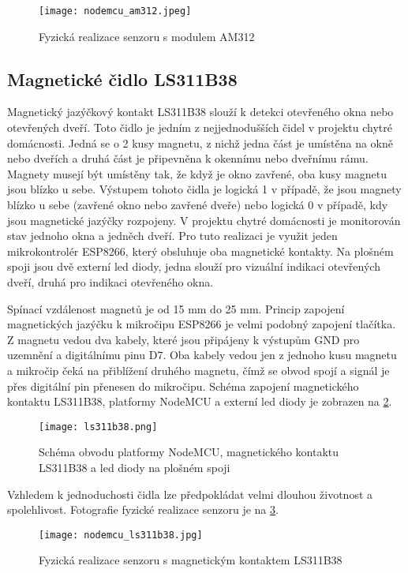 \begin{figure}[H]
  \centering
  \texttt{[image: nodemcu\_am312.jpeg]}
  \caption{Fyzická realizace senzoru s modulem AM312}
  \label{fig:nodemcu_am312}
\end{figure} 

\subsection{Magnetické čidlo LS311B38}
Magnetický jazýčkový kontakt LS311B38 slouží k detekci otevřeného okna nebo otevřených dveří. Toto čidlo je jedním z nejjednodušších čidel v \mbox{projektu} chytré domácnosti. Jedná se o 2 kusy magnetu, z nichž jedna část je umístěna na okně nebo dveřích a druhá část je připevněna k okennímu nebo \mbox{dveřnímu} rámu. Magnety musejí být umístěny tak, že když je okno zavřené, oba kusy magnetu jsou blízko u sebe. Výstupem tohoto čidla je logická 1 v případě, že jsou magnety blízko u sebe (zavřené okno nebo zavřené dveře) nebo logická 0 v případě, kdy jsou magnetické jazýčky rozpojeny. V projektu chytré domácnosti je monitorován stav jednoho okna a jedněch dveří. Pro tuto realizaci je využit jeden mikrokontrolér ESP8266, který obsluhuje oba magnetické kontakty. Na plošném spoji jsou dvě externí led diody, jedna slouží pro vizuální indikaci otevřených dveří, druhá pro indikaci otevřeného okna. \par
Spínací vzdálenost magnetů je od 15 mm do 25 mm. Princip zapojení magnetických jazýčku k mikročipu ESP8266 je velmi podobný zapojení tlačítka. Z magnetu vedou dva kabely, které jsou připájeny k výstupům GND pro uzemnění a digitálnímu pinu D7. Oba kabely vedou jen z jednoho kusu magnetu a mikročip čeká na přiblížení druhého magnetu, čímž se obvod spojí a signál je přes digitální pin přenesen do mikročipu. Schéma zapojení magnetického kontaktu LS311B38, platformy NodeMCU a externí led diody je zobrazen na \cref{fig:schema_esp_ls311b38}.

\begin{figure}[H]
  \centering
  \texttt{[image: ls311b38.png]}
  \caption{Schéma obvodu platformy NodeMCU, magnetického kontaktu LS311B38 a led diody na plošném spoji}
  \label{fig:schema_esp_ls311b38}
\end{figure}

Vzhledem k jednoduchosti čidla lze předpokládat velmi dlouhou životnost a spolehlivost. Fotografie fyzické realizace senzoru je na \cref{fig:nodemcu_ls311b38}.

\begin{figure}[H]
  \centering
  \texttt{[image: nodemcu\_ls311b38.jpg]}
  \caption{Fyzická realizace senzoru s magnetickým kontaktem LS311B38}
  \label{fig:nodemcu_ls311b38}
\end{figure} 

